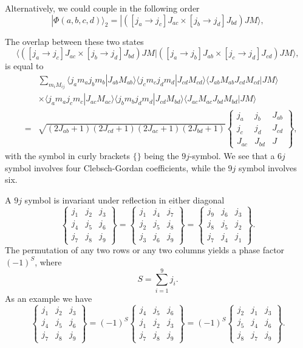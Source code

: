\documentclass[graybox,sectrefs,envcountresetchap,open=right]{svmonodo}
\begin{document}
Alternatively, we could couple in the following order
\[
|\Phi(a,b,c,d)\rangle_2 = | ([j_a\rightarrow j_c]J_{ac}\times [j_b\rightarrow j_d]J_{bd}) JM\rangle, 
\]



The overlap between these two states
\[
\langle([j_a\rightarrow j_c]J_{ac}\times [j_b\rightarrow j_d]J_{bd}) JM| ([j_a\rightarrow j_b]J_{ab}\times [j_c\rightarrow j_d]J_{cd}) JM\rangle, 
\]
is equal to 
\begin{eqnarray}
\nonumber
& & \sum_{m_iM_{ij}}\langle j_am_aj_bm_b|J_{ab}M_{ab}\rangle \langle j_cm_cj_dm_d|J_{cd}M_{cd}\rangle \langle J_{ab}M_{ab}J_{cd}M_{cd}|JM\rangle \\
& & \times\langle j_am_aj_cm_c|J_{ac}M_{ac}\rangle \langle j_bm_bj_dm_d|J_{cd}M_{bd}\rangle \langle J_{ac}M_{ac}J_{bd}M_{bd}|JM\rangle \\  \nonumber
&= & \sqrt{(2J_{ab}+1)(2J_{cd}+1)(2J_{ac}+1)(2J_{bd}+1)}\left\{\begin{array}{ccc} j_a & j_b& J_{ab} \\ j_c & j_d& J_{cd} \\J_{ac} & J_{bd}& J\end{array}\right\}
, \nonumber
\end{eqnarray}
with the symbol in curly brackets $\{\}$ being the $9j$-symbol. We see  that a $6j$ symbol  involves four Clebsch-Gordan coefficients, while the $9j$ symbol
involves six.




A $9j$ symbol is invariant under reflection in either diagonal
\[
    \begin{Bmatrix} j_1 & j_2 & j_3\\ j_4 & j_5 & j_6\\ j_7 & j_8 & j_9 \end{Bmatrix} = \begin{Bmatrix} j_1 & j_4 & j_7\\ j_2 & j_5 & j_8\\ j_3 & j_6 & j_9 \end{Bmatrix} = \begin{Bmatrix} j_9 & j_6 & j_3\\ j_8 & j_5 & j_2\\ j_7 & j_4 & j_1 \end{Bmatrix}. 
\]
The permutation of any two rows or any two columns yields a phase factor $(-1)^S$, where
\[
    S=\sum_{i=1}^9 j_i. 
\]
As an  example we have
\[
    \begin{Bmatrix} j_1 & j_2 & j_3\\ j_4 & j_5 & j_6\\ j_7 & j_8 & j_9 \end{Bmatrix} = (-1)^S \begin{Bmatrix} j_4 & j_5 & j_6\\ j_1 & j_2 & j_3\\ j_7 & j_8 & j_9 \end{Bmatrix} = (-1)^S \begin{Bmatrix} j_2 & j_1 & j_3\\ j_5 & j_4 & j_6\\ j_8 & j_7 & j_9 \end{Bmatrix}. 
\]
\end{document}
